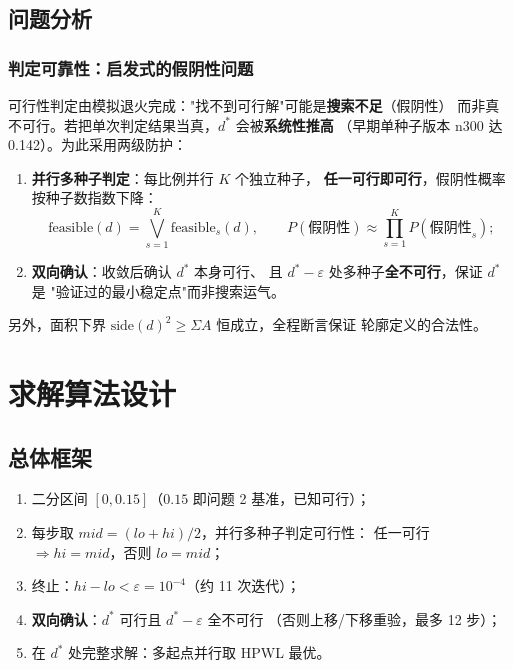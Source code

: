 \documentclass[12pt,a4paper]{article}
\begin{document}
\subsection{问题分析}

\subsubsection{判定可靠性：启发式的假阴性问题}

可行性判定由模拟退火完成："找不到可行解"可能是\textbf{搜索不足}（假阴性）
而非真不可行。若把单次判定结果当真，$d^*$ 会被\textbf{系统性推高}
（早期单种子版本 n300 达 0.142）。为此采用两级防护：

\begin{enumerate}
    \item \textbf{并行多种子判定}：每比例并行 $K$ 个独立种子，
    \textbf{任一可行即可行}，假阴性概率按种子数指数下降：
    \begin{equation}
    \text{feasible}(d) = \bigvee_{s=1}^{K} \text{feasible}_s(d), \qquad
    P(\text{假阴性}) \approx \prod_{s=1}^{K} P(\text{假阴性}_s);
    \end{equation}
    \item \textbf{双向确认}：收敛后确认 $d^*$ 本身可行、
    且 $d^* - \varepsilon$ 处多种子\textbf{全不可行}，保证 $d^*$ 是
    "验证过的最小稳定点"而非搜索运气。
\end{enumerate}

另外，面积下界 $\text{side}(d)^2 \ge \Sigma A$ 恒成立，全程断言保证
轮廓定义的合法性。

\section{求解算法设计}

\subsection{总体框架}

\begin{tcolorbox}[colback=blue!5, colframe=blue!60, title=算法流程]
\begin{enumerate}
    \item 二分区间 $[0, 0.15]$（$0.15$ 即问题 2 基准，已知可行）；
    \item 每步取 $mid = (lo+hi)/2$，并行多种子判定可行性：
    任一可行 $\Rightarrow hi = mid$，否则 $lo = mid$；
    \item 终止：$hi - lo < \varepsilon = 10^{-4}$（约 11 次迭代）；
    \item \textbf{双向确认}：$d^*$ 可行且 $d^*-\varepsilon$ 全不可行
    （否则上移/下移重验，最多 12 步）；
    \item 在 $d^*$ 处完整求解：多起点并行取 HPWL 最优。
\end{enumerate}
\end{tcolorbox}
\end{document}
